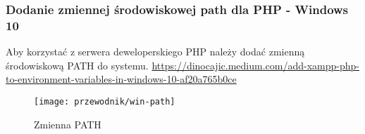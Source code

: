         \subsubsection{Dodanie zmiennej środowiskowej path dla PHP - Windows 10}
        Aby korzystać z serwera deweloperskiego PHP należy dodać zmienną środowiskową PATH do systemu.
        \url{https://dinocajic.medium.com/add-xampp-php-to-environment-variables-in-windows-10-af20a765b0ce} \\
        \begin{figure}[!htb]
            \centering
            \texttt{[image: przewodnik/win-path]}
            \caption{Zmienna PATH}                
        \end{figure}


